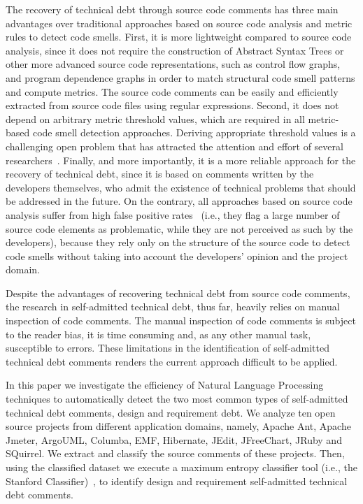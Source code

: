 \documentclass{sig-alternate}
\newcommand{\SATD}{self-admitted technical debt\xspace}
\begin{document}
The recovery of technical debt through source code comments has three main advantages over traditional approaches based on source code analysis and metric rules to detect code smells.
First, it is more lightweight compared to source code analysis, since it does not require the construction of Abstract Syntax Trees or other more advanced source code representations, such as control flow graphs, and program dependence graphs in order to match structural code smell patterns and compute metrics.
The source code comments can be easily and efficiently extracted from source code files using regular expressions.
Second, it does not depend on arbitrary metric threshold values, which are required in all metric-based code smell detection approaches.
Deriving appropriate threshold values is a challenging open problem that has attracted the attention and effort of several researchers~\cite{Oliveira:2014,Fontana:2015,Fontana:EMSE:2015}.
Finally, and more importantly, it is a more reliable approach for the recovery of technical debt, since it is based on comments written by the developers themselves, who admit the existence of technical problems that should be addressed in the future.
On the contrary, all approaches based on source code analysis suffer from high false positive rates~\cite{Ferme:2013} (i.e., they flag a large number of source code elements as problematic, while they are not perceived as such by the developers), because they rely only on the structure of the source code to detect code smells without taking into account the developers' opinion and the project domain.


Despite the advantages of recovering technical debt from source code comments, the research in \SATD, thus far, heavily relies on manual inspection of code comments. The manual inspection of code comments is subject to the reader bias, it is time consuming and, as any other manual task, susceptible to errors. These limitations in the identification of \SATD comments renders the current approach difficult to be applied.

In this paper we investigate the efficiency of Natural Language Processing techniques to automatically detect the two most common types of \SATD comments, design and requirement debt. We analyze ten open source projects from different application domains, namely, Apache Ant, Apache Jmeter, ArgoUML, Columba, EMF, Hibernate, JEdit, JFreeChart, JRuby and SQuirrel. We extract and classify the source comments of these projects. Then, using the classified dataset we execute a maximum entropy classifier tool (i.e., the Stanford Classifier)~\cite{Manning2014ACL}, to identify design and requirement \SATD comments.
\end{document}
